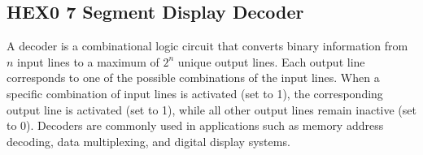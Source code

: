 \documentclass[11pt]{report}
\begin{document}
\subsection{HEX0 7 Segment Display Decoder}
\begin{definition}[Decoder]
    A decoder is a combinational logic circuit that converts binary information from $n$ input lines to a maximum of $2^n$ unique output lines. Each output line corresponds to one of the possible combinations of the input lines. When a specific combination of input lines is activated (set to 1), the corresponding output line is activated (set to 1), while all other output lines remain inactive (set to 0). Decoders are commonly used in applications such as memory address decoding, data multiplexing, and digital display systems.
    
\end{definition}
\end{document}
